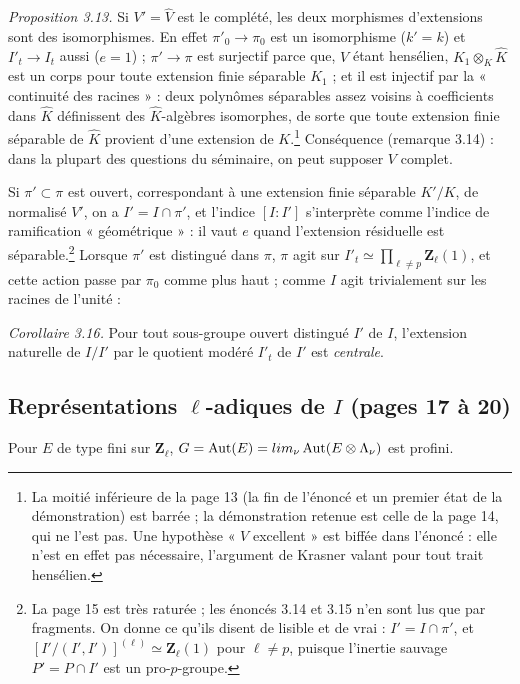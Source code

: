 \documentclass[11pt,a4paper]{article}
\begin{document}
\emph{Proposition 3.13.} Si $V' = \widehat V$ est le complété, les deux morphismes
d'extensions sont des isomorphismes. En effet $\pi'_0 \to \pi_0$ est un
isomorphisme ($k' = k$) et $I'_t \to I_t$ aussi ($e = 1$) ; $\pi' \to \pi$ est
surjectif parce que, $V$ étant hensélien, $K_1 \otimes_K \widehat K$ est un corps
pour toute extension finie séparable $K_1$ ; et il est injectif par la
« continuité des racines » : deux polynômes séparables assez voisins à
coefficients dans $\widehat K$ définissent des $\widehat K$-algèbres isomorphes,
de sorte que toute extension finie séparable de $\widehat K$ provient d'une
extension de $K$.\footnote{La moitié inférieure de la page 13 (la fin de
l'énoncé et un premier état de la démonstration) est barrée ; la démonstration
retenue est celle de la page 14, qui ne l'est pas. Une hypothèse « $V$
excellent » est biffée dans l'énoncé : elle n'est en effet pas nécessaire,
l'argument de Krasner valant pour tout trait hensélien.} Conséquence (remarque
3.14) : dans la plupart des questions du séminaire, on peut supposer $V$
complet.

Si $\pi' \subset \pi$ est ouvert, correspondant à une extension finie séparable
$K'/K$, de normalisé $V'$, on a $I' = I \cap \pi'$, et l'indice $[I : I']$
s'interprète comme l'indice de ramification « géométrique » : il vaut $e$ quand
l'extension résiduelle est séparable.\footnote{La page 15 est très raturée ; les
énoncés 3.14 et 3.15 n'en sont lus que par fragments. On donne ce qu'ils disent
de lisible et de vrai : $I' = I \cap \pi'$, et
$[I'/(I',I')]^{(\ell)} \simeq \mathbf{Z}_\ell(1)$ pour $\ell \neq p$, puisque
l'inertie sauvage $P' = P \cap I'$ est un pro-$p$-groupe.} Lorsque $\pi'$ est
distingué dans $\pi$, $\pi$ agit sur $I'_t \simeq \prod_{\ell\neq p}
\mathbf{Z}_\ell(1)$, et cette action passe par $\pi_0$ comme plus haut ; comme
$I$ agit trivialement sur les racines de l'unité :

\emph{Corollaire 3.16.} Pour tout sous-groupe ouvert distingué $I'$ de $I$,
l'extension naturelle de $I/I'$ par le quotient modéré $I'_t$ de $I'$ est
\emph{centrale}.

\subsection*{Représentations $\ell$-adiques de $I$ (pages 17 à 20)}

Pour $E$ de type fini sur $\mathbf{Z}_\ell$, $G = \operatorname{Aut}(E) =
\varprojlim_\nu \operatorname{Aut}(E \otimes \Lambda_\nu)$ est profini.
\end{document}
